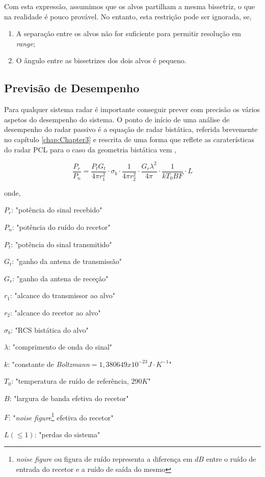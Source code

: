 Com esta expressão, assumimos que os alvos partilham a mesma bissetriz, o que na realidade é pouco provável. No entanto, esta restrição pode ser ignorada, se,
\begin{enumerate}
	\item A separação entre os alvos não for suficiente para permitir resolução em \textit{range};
	\item O ângulo entre as bissetrizes dos dois alvos é pequeno.
\end{enumerate}



\subsection{Previsão de Desempenho}
Para qualquer sistema radar é importante conseguir prever com precisão os vários aspetos do desempenho do sistema. O ponto de início de uma análise de desempenho do radar passivo é a equação de radar bistática, referida brevemente no capítulo \ref{chap:Chapter3} e rescrita  de uma forma que reflete as caraterísticas do radar \gls{PCL} para o caso da geometria bistática vem \parencite{Griffiths2005},

\begin{equation} \label{2.8}
\dfrac{P_{r}}{P_{n}}= \dfrac{P_{t}G_{t}}{4\pi r^{2}_{1}}\cdot\sigma_{b}\cdot\dfrac{1}{4\pi r^{2}_{2}}\cdot\dfrac{G_{r}\lambda^{2}}{4\pi}\cdot\dfrac{1}{kT_{0}BF}\cdot L 
\end{equation}

onde,\par
$P_{r}$: "potência do sinal recebido"\par
$P_{n}$: "potência do ruído do recetor"\par
$P_{t}$: "potência do sinal transmitido"\par
$G_{t}$: "ganho da antena de transmissão"\par
$G_{r}$: "ganho da antena de receção"\par
$r_{1}$: "alcance do transmissor ao alvo"\par
$r_{2}$: "alcance do recetor ao alvo"\par
$\sigma_{b}$: "\gls{RCS} bistática do alvo"\par
$\lambda$: "comprimento de onda do sinal"\par
$k$: "constante de \textit{Boltzmann}$ =1,380649x10^{-23} J\cdot K^{-1}$"\par
$T_{0}$: "temperatura de ruído de referência, $290K$"\par
$B$: "largura de banda efetiva do recetor"\par
$F$: "\textit{noise figure}\footnote{\textit{noise figure} ou figura de ruído representa a diferença em $dB$ entre o ruído de entrada do recetor e a ruído de saída do mesmo} efetiva do recetor"\par
$L(\leq 1)$: "perdas do sistema"\par
 
